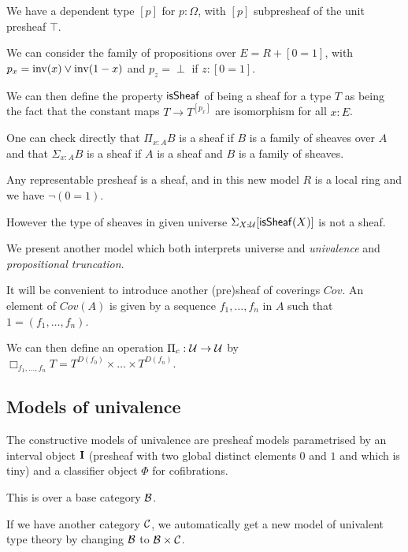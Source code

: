     We have a dependent type $[p]$ for $p:\Omega$, with $[p]$ subpresheaf of the unit presheaf $\top$.

    We can consider the family of propositions over $E = R + [0=1]$, with $p_x = \mathrm{inv}(x)\vee\mathrm{inv}(1-x)$
    and $p_z = \perp$ if $z:[0=1]$.

    We can then define the property $\mathsf{isSheaf}$ of being a sheaf for a type $T$ as being the fact that
    the constant maps $T\rightarrow T^{[p_x]}$ are isomorphism for all $x:E$.

    \medskip

    One can check directly that $\Pi_{x:A}B$ is a sheaf if $B$ is a family of sheaves over $A$
    and that $\Sigma_{x:A}B$ is a sheaf if $A$ is a sheaf and $B$ is a family of sheaves.

    \medskip

    Any representable presheaf is a sheaf, and in this new model $R$ is a local ring and we have
    $\neg (0 = 1)$.
    
    \medskip

    However the type of sheaves in given universe $\Sigma_{X:\mathcal{U}}[\mathsf{isSheaf}(X)]$ is not a sheaf.

    We present another model which both interprets universe and {\em univalence} and
    {\em propositional truncation}.

    \medskip

    It will be convenient to introduce another (pre)sheaf of coverings $Cov$. An element of $Cov(A)$ is given by
    a sequence $f_1,\dots,f_n$ in $A$ such that $1 = (f_1,\dots,f_n)$.

    We can then define an operation $\Pi_c : \mathcal{U}\rightarrow \mathcal{U}$ by 
    $\Box_{f_1,\dots,f_n}T = T^{D(f_0)}\times\dots\times T^{D(f_n)}$.


\subsection{Models of univalence}

The constructive models of univalence are presheaf models parametrised by an interval object $\mathbf{I}$
(presheaf with two global distinct elements $0$ and $1$ and which is tiny) and a classifier object
$\Phi$ for cofibrations.

 This is over a base category $\mathcal{B}$.
 
 If we have another category $\mathcal{C}$, we automatically get a new model of univalent type theory by
 changing $\mathcal{B}$ to $\mathcal{B}\times\mathcal{C}$.

